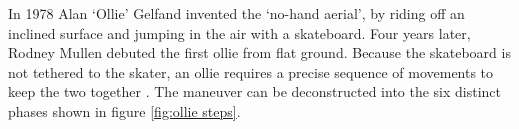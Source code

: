 \documentclass[default,iicol]{sn-jnl}
\begin{document}
In 1978 Alan `Ollie' Gelfand invented the `no-hand aerial', by riding off an inclined surface and jumping in the air with a skateboard.
Four years later, Rodney Mullen debuted the first ollie from flat ground.
Because the skateboard is not tethered to the skater, an ollie requires a precise sequence of movements to keep the two together \cite{frederick_biomechanics_2006}.
The maneuver can be deconstructed into the six
distinct phases shown in figure \ref{fig:ollie steps}.

\begin{figure}[!t]
\captionsetup[subfigure]{labelformat=empty}

\end{figure}
\end{document}

